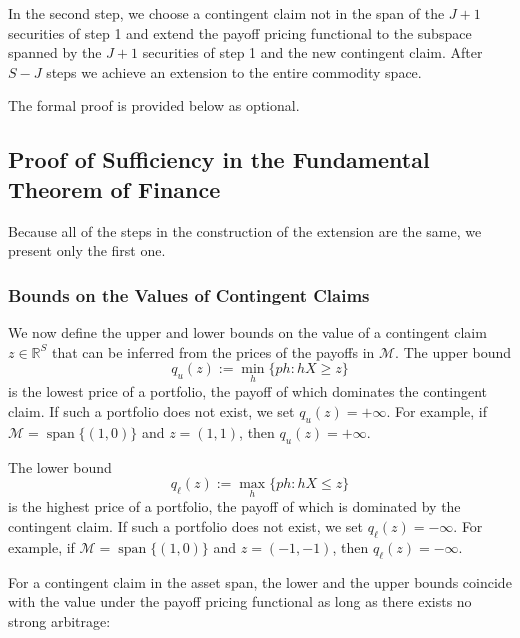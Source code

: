 \documentclass[\topdir/lecture\_notes.tex]{subfiles}
\begin{document}
In the second step, we choose a contingent claim not in the span of the $J+1$ securities of step 1 and extend the payoff pricing functional to the subspace spanned by the $J+1$ securities of step 1 and the new contingent claim. After $S-J$ steps we achieve an extension to the entire commodity space.

The formal proof is provided below as optional.

\begin{optional}
\subsection{Proof of Sufficiency in the Fundamental Theorem of Finance}
Because all of the steps in the construction of the extension are the same, we present only the first one.
\subsubsection*{Bounds on the Values of Contingent Claims}
We now define the upper and lower bounds on the value of a contingent claim $z \in \mathbb{R}^{S}$ that can be inferred from the prices of the payoffs in $\mathcal{M}$. The upper bound
\begin{equation}
q_{u}(z) := \min _{h}\{p h: h X \geq z\} \label{4.3}
\end{equation}
is the lowest price of a portfolio, the payoff of which dominates the contingent claim. If such a portfolio does not exist, we set $q_{u}(z)=+\infty$. For example, if $\mathcal{M}=\operatorname{span}\{(1,0)\}$ and $z=(1,1)$, then $q_{u}(z)=+\infty$.

The lower bound
\begin{equation}
q_{\ell}(z) := \max _{h}\{p h: h X \leq z\} \label{4.4}
\end{equation}
is the highest price of a portfolio, the payoff of which is dominated by the contingent claim. If such a portfolio does not exist, we set $q_{\ell}(z)=-\infty$. For example, if $\mathcal{M}=\operatorname{span}\{(1,0)\}$ and $z=(-1,-1)$, then $q_{\ell}(z)=-\infty$.

For a contingent claim in the asset span, the lower and the upper bounds coincide with the value under the payoff pricing functional as long as there exists no strong arbitrage:


\end{optional}
\end{document}
